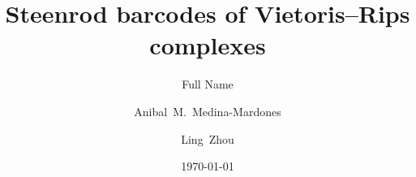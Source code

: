 \documentclass{amsart}
\title{Steenrod barcodes of Vietoris--Rips complexes}
\author[Last Name]{Full Name}
\author[Medina-Mardones]{Anibal~M.~Medina-Mardones}
\author[Zhou]{Ling~Zhou}
\date{\today}
\begin{document}
	
	\maketitle
	
	
	
	
	
	\sloppy
	\printbibliography
%	
\end{document}
